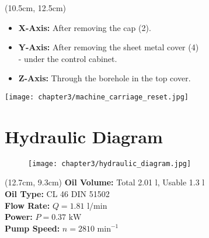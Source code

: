 \begin{textblock*}{\textwidth}(10.5cm, 12.5cm)
\begin{itemize}
    \item \textbf{X-Axis:} After removing the cap (2).  
    \item \textbf{Y-Axis:} After removing the sheet metal cover (4) \\- under the control cabinet.  
    \item \textbf{Z-Axis:} Through the borehole in the top cover.  
\end{itemize}

\vspace{0.3cm}


\end{textblock*}

\begin{minipage}{\textwidth}
    \centering
    \texttt{[image: chapter3/machine\_carriage\_reset.jpg]}
\end{minipage}

\section{Hydraulic Diagram}
\setcounter{section}{18}

\begin{figure}[h]
    \centering
    \texttt{[image: chapter3/hydraulic\_diagram.jpg]}
\end{figure}

\begin{textblock*}{\textwidth}(12.7cm, 9.3cm)
    \textbf{Oil Volume:} Total 2.01 l, Usable 1.3 l \\
    \textbf{Oil Type:} CL 46 DIN 51502 \\
    \textbf{Flow Rate:} $Q = 1.81 \text{ l/min}$ \\
    \textbf{Power:} $P = 0.37 \text{ kW}$ \\
    \textbf{Pump Speed:} $n = 2810 \text{ min}^{-1}$
\end{textblock*}

